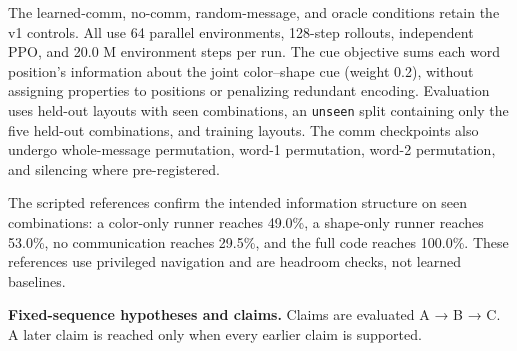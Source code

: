 The learned-comm, no-comm, random-message, and oracle conditions retain
the v1 controls. All use 64 parallel environments, 128-step rollouts,
independent PPO, and 20.0 M environment steps per run. The cue objective
sums each word position's information about the joint color--shape cue
(weight 0.2), without assigning properties to positions or penalizing
redundant encoding. Evaluation uses held-out layouts with seen
combinations, an \texttt{unseen} split containing only the five held-out
combinations, and training layouts. The comm checkpoints also undergo
whole-message permutation, word-1 permutation, word-2 permutation, and
silencing where pre-registered.

The scripted references confirm the intended information structure on
seen combinations: a color-only runner reaches 49.0\%, a shape-only
runner reaches 53.0\%, no communication reaches 29.5\%, and the full
code reaches 100.0\%. These references use privileged navigation and are
headroom checks, not learned baselines.

\textbf{Fixed-sequence hypotheses and claims.} Claims are evaluated A →
B → C. A later claim is reached only when every earlier claim is
supported.

\begin{center}
\small
{}
\end{center}

